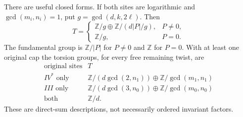\begin{theorem}
There are useful closed forms. If both sites are
logarithmic and $\gcd(m_i,n_i)=1$, put
$g=\gcd(d,k,2\ell)$. Then
\[
 T=
 \begin{cases}
 \mathbb Z/g\oplus\mathbb Z/(d|P|/g),&P\ne0,\\
 \mathbb Z/g,&P=0.
 \end{cases}                                               \tag{D.WE7}\label{maps:eq:D.WE7}
\]
The fundamental group is $\mathbb Z/|P|$ for $P\ne0$
and $\mathbb Z$ for $P=0$. With at least one original
cap the torsion groups, for every free remaining twist,
are
\[
\begin{array}{c|c}
\text{original sites}&T\\\hline
IV^*\text{ only}&
 \mathbb Z/(d\gcd(2,n_1))\oplus\mathbb Z/\gcd(m_1,n_1)\\
III\text{ only}&
 \mathbb Z/(d\gcd(3,n_0))\oplus\mathbb Z/\gcd(m_0,n_0)\\
\text{both}&\mathbb Z/d .
\end{array}                                                \tag{D.WE8}\label{maps:eq:D.WE8}
\]
These are direct-sum descriptions, not necessarily
ordered invariant factors.

\end{theorem}


